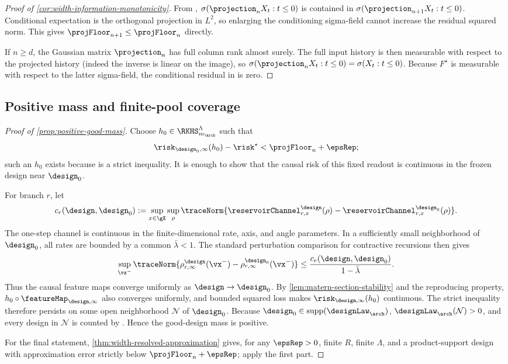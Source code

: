 \begin{proof}[Proof of \cref{cor:width-information-monotonicity}]
From ,
$\sigma(\projection_nX_t:t\leq0)$ is contained in
$\sigma(\projection_{n+1}X_t:t\leq0)$.  Conditional expectation is the
orthogonal projection in $L^2$, so enlarging the conditioning sigma-field
cannot increase the residual squared norm.  This gives
$\projFloor_{n+1}\leq\projFloor_n$ directly.

If $n\geq d$, the Gaussian matrix $\projection_n$ has full column rank almost
surely.  The full input history is then measurable with respect to the
projected history (indeed the inverse is linear on the image), so
$\sigma(\projection_nX_t:t\leq0)=\sigma(X_t:t\leq0)$.  Because $F^\star$ is
measurable with respect to the latter sigma-field, the conditional residual in
 is zero.
\end{proof}

\subsection{Positive mass and finite-pool coverage}

\begin{proof}[Proof of \cref{prop:positive-good-mass}]
Choose $h_0\in\RKHS_{m_{\arch}}^\Lambda$ such that
\[
    \risk_{\design_0,\infty}(h_0)-\risk^\star
    <\projFloor_n+\epsRep;
\]
such an $h_0$ exists because  is a strict
inequality.  It is enough to show that the causal risk of this fixed readout is
continuous in the frozen design near $\design_0$.

For branch $r$, let
\[
    c_r(\design,\design_0)
    :=\sup_{x\in\gX}\sup_{\rho}
      \traceNorm{\reservoirChannel^{\design}_{r,x}(\rho)
       -\reservoirChannel^{\design_0}_{r,x}(\rho)}.
\]
The one-step channel is continuous in the finite-dimensional rate, axis, and
angle parameters.  In a sufficiently small neighborhood of $\design_0$, all
rates are bounded by a common $\bar\lambda<1$.  The standard perturbation
comparison for contractive recursions then gives
\[
    \sup_{\vx^-}
    \traceNorm{\rho^{\design}_{r,\infty}(\vx^-)
      -\rho^{\design_0}_{r,\infty}(\vx^-)}
    \leq\frac{c_r(\design,\design_0)}{1-\bar\lambda}.
\]
Thus the causal feature maps converge uniformly as
$\design\to\design_0$.  By \cref{lem:matern-section-stability} and the
reproducing property, $h_0\circ\featureMap_{\design,\infty}$ also converges
uniformly, and bounded squared loss makes
$\risk_{\design,\infty}(h_0)$ continuous.  The strict inequality therefore
persists on some open neighborhood $\mathcal N$ of $\design_0$.  Because
$\design_0\in\operatorname{supp}(\designLaw_{\arch})$,
$\designLaw_{\arch}(\mathcal N)>0$, and every design in $\mathcal N$ is counted
by .  Hence the good-design mass is positive.

For the final statement, \cref{thm:width-resolved-approximation} gives, for any
$\epsRep>0$, finite $R$, finite $\Lambda$, and a product-support design with
approximation error strictly below $\projFloor_n+\epsRep$; apply the first part.
\end{proof}

